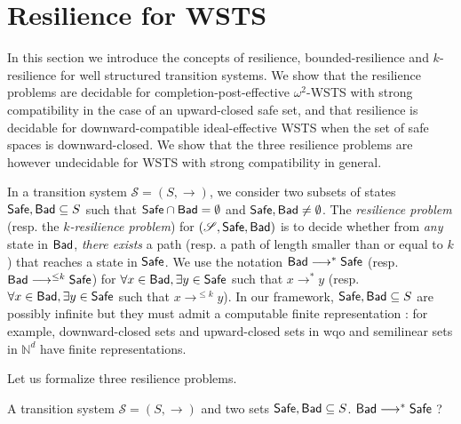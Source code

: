 
\section{Resilience for WSTS}


In this section we introduce the concepts of resilience, bounded-resilience and $k$-resilience for well structured transition systems. We show that the resilience problems are decidable
for  completion-post-effective $\omega^2$-WSTS with strong compatibility
in the case of an upward-closed safe set,
and that resilience is decidable for downward-compatible ideal-effective WSTS
when the set of safe spaces is downward-closed. 
We show that the three resilience problems are however undecidable for WSTS with
strong compatibility in general.


In a transition system $\mathscr{S}=(S,\rightarrow)$, we consider two subsets of states $\textsf{Safe}, \textsf{Bad} \subseteq S$ such that $\textsf{Safe} \cap  \textsf{Bad} = \emptyset$ and $\textsf{Safe} ,  \textsf{Bad} \neq \emptyset$.
The \emph{resilience problem} (resp. the \emph{$k$-resilience problem}) for $(\mathscr{S},\textsf{Safe},\textsf{Bad})$ is to decide whether from \emph{any} state in $\textsf{Bad}$, \emph{there exists} a path (resp. a path of length smaller than or equal to $k$) that reaches a state in $\textsf{Safe}$. We use the notation $\textsf{Bad} \longrightarrow^{*} \textsf{Safe}$ (resp. $\textsf{Bad} \longrightarrow^{\leq k} \textsf{Safe}$) for $\forall x \in \textsf{Bad}, \exists y \in \textsf{Safe}$ such that $x \longrightarrow^{*} y$ (resp.  $\forall x \in \textsf{Bad}, \exists y \in \textsf{Safe}$ such that $x \longrightarrow^{\leq k} y$). In our framework, $\textsf{Safe}, \textsf{Bad} \subseteq S$  are possibly infinite but they must admit a computable finite representation : for example, downward-closed sets and upward-closed sets in wqo and semilinear sets in $\mathbb{N}^d$ have finite representations. 





Let us formalize three resilience problems.


{A transition system $\mathscr{S}=(S,\rightarrow)$ and two sets $\textsf{Safe}, \textsf{Bad} \subseteq S$.}
{$\textsf{Bad} \longrightarrow^{*} \textsf{Safe}$ ?\newline}



